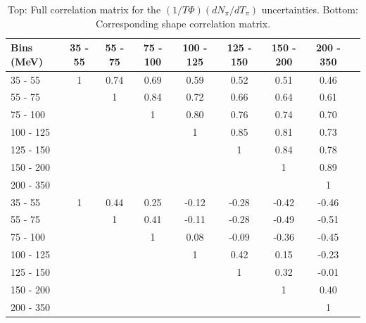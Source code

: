 \begingroup
\squeezetable
\begin{table}[h]
\begin{tabular}{l|cccccccc}
\hline\hline
Bins (MeV) & 35 - 55 & 55 - 75 & 75 - 100 & 100 - 125 & 125 - 150 & 150 - 200 & 200 - 350 \\ 
\hline
35 - 55 & 1 & 0.74 & 0.69 & 0.59 & 0.52 & 0.51 & 0.46 \\ 
55 - 75 &  & 1 & 0.84 & 0.72 & 0.66 & 0.64 & 0.61 \\ 
75 - 100 &  &  & 1 & 0.80 & 0.76 & 0.74 & 0.70 \\ 
100 - 125 &  &  &  & 1 & 0.85 & 0.81 & 0.73 \\ 
125 - 150 &  &  &  &  & 1 & 0.84 & 0.78 \\ 
150 - 200 &  &  &  &  &  & 1 & 0.89 \\ 
200 - 350 &  &  &  &  &  &  & 1 \\ 
\hline
35 - 55 & 1 & 0.44 & 0.25 & -0.12 & -0.28 & -0.42 & -0.46 \\ 
55 - 75 &  & 1 & 0.41 & -0.11 & -0.28 & -0.49 & -0.51 \\ 
75 - 100 &  &  & 1 & 0.08 & -0.09 & -0.36 & -0.45 \\ 
100 - 125 &  &  &  & 1 & 0.42 & 0.15 & -0.23 \\ 
125 - 150 &  &  &  &  & 1 & 0.32 & -0.01 \\ 
150 - 200 &  &  &  &  &  & 1 & 0.40 \\ 
200 - 350 &  &  &  &  &  &  & 1 \\ 
\hline\hline
\end{tabular}
\caption{Top: Full correlation matrix for the \ccpi $(1/T\Phi)(dN_{\pi} / dT_\pi)$ uncertainties.  Bottom: Corresponding shape correlation matrix.}
\end{table}
\endgroup

